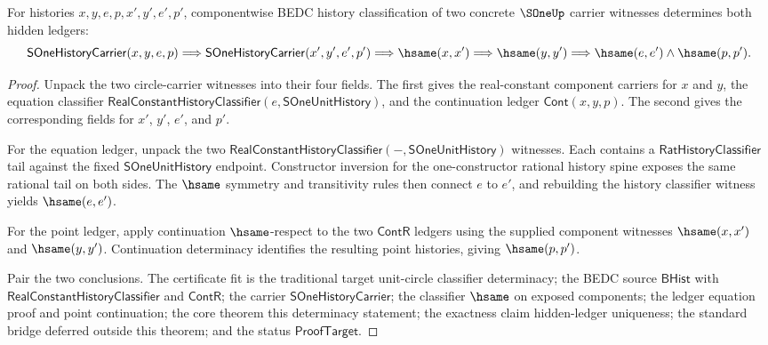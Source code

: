 \begin{theorem}
\label{thm:s1-component-classifier-ledger-determinacy}
For histories $x,y,e,p,x',y',e',p'$, componentwise BEDC history
classification of two concrete $\SOneUp$ carrier witnesses determines both
hidden ledgers:
$$
\mathsf{SOneHistoryCarrier}(x,y,e,p)
\Longrightarrow
\mathsf{SOneHistoryCarrier}(x',y',e',p')
\Longrightarrow
\hsame(x,x')
\Longrightarrow
\hsame(y,y')
\Longrightarrow
\hsame(e,e') \wedge \hsame(p,p').
$$
\end{theorem}
\begin{proof}
Unpack the two circle-carrier witnesses into their four fields. The first gives
the real-constant component carriers for $x$ and $y$, the equation classifier
$\mathsf{RealConstantHistoryClassifier}(e,\mathsf{SOneUnitHistory})$, and the
continuation ledger $\mathsf{Cont}(x,y,p)$. The second gives the corresponding
fields for $x'$, $y'$, $e'$, and $p'$.

For the equation ledger, unpack the two
$\mathsf{RealConstantHistoryClassifier}(-,\mathsf{SOneUnitHistory})$ witnesses.
Each contains a $\mathsf{RatHistoryClassifier}$ tail against the fixed
$\mathsf{SOneUnitHistory}$ endpoint. Constructor inversion for the
one-constructor rational history spine exposes the same rational tail on both
sides. The $\hsame$ symmetry and transitivity rules then connect $e$ to $e'$,
and rebuilding the history classifier witness yields $\hsame(e,e')$.

For the point ledger, apply continuation $\hsame$-respect to the two
$\mathsf{ContR}$ ledgers using the supplied component witnesses
$\hsame(x,x')$ and $\hsame(y,y')$. Continuation determinacy identifies the
resulting point histories, giving $\hsame(p,p')$.

Pair the two conclusions. The certificate fit is the traditional target
unit-circle classifier determinacy; the BEDC source $\mathsf{BHist}$ with
$\mathsf{RealConstantHistoryClassifier}$ and $\mathsf{ContR}$; the carrier
$\mathsf{SOneHistoryCarrier}$; the classifier $\hsame$ on exposed components;
the ledger equation proof and point continuation; the core theorem this
determinacy statement; the exactness claim hidden-ledger uniqueness; the
standard bridge deferred outside this theorem; and the status
$\mathsf{ProofTarget}$.
\end{proof}

